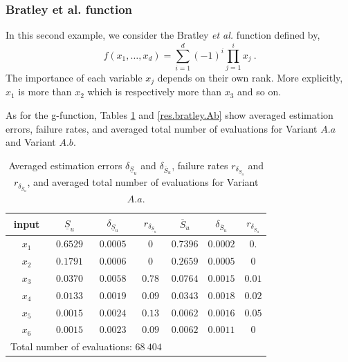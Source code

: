 \subsubsection{Bratley et al. function}

In this second example, we consider the Bratley \textit{et al.} function defined by,
$$f(x_1,\dots,x_d)=\sum \limits_{i=1}^{d} (-1)^i \prod \limits_{j=1}^{i} x_j \ .$$
The importance of each variable $x_j$ depends on their own rank. More explicitly, $x_1$ is more  than $x_2$ which is respectively more  than $x_3$ and so on. 

As for the g-function, Tables \ref{res.bratley.Aa} and \ref{res.bratley.Ab} show averaged estimation errors, failure rates, and averaged total number of evaluations for Variant $A.a$ and Variant $A.b$.
\begin{table}[t]
\caption{Averaged estimation errors $\delta_{\underline{S}_u}$ and $\delta_{\overline{S}_u}$, failure rates $r_{\delta_{\underline{S}_u}}$ and $r_{\delta_{\overline{S}_u}}$, and averaged total number of evaluations for Variant $A.a$.}
\centering
\begin{tabular}{ccccccc}
\hline
 input & $\underline{S}_u$ & $\delta_{\underline{S}_u}$ & $r_{\delta_{\underline{S}_u}}$ & $\overline{S}_u$ & $\delta_{\overline{S}_u}$ &$r_{\delta_{\overline{S}_u}}$ \\ \hline
 $x_1$ & $0.6529$ &  $0.0005$ & $0$ & $0.7396$ & $0.0002$ & $0.$ \\ \hline
 $x_2$ & $0.1791$ &  $0.0006$ & $0$ & $0.2659$ & $0.0005$ & $0$ \\ \hline
 $x_3$ & $0.0370$ &  $0.0058$ & $0.78$ & $0.0764$ & $0.0015$ & $0.01$ \\ \hline
 $x_4$ & $0.0133$ &  $0.0019$ & $0.09$ & $0.0343$ & $0.0018$ & $0.02$ \\ \hline
 $x_5$ & $0.0015$ &  $0.0024$ & $0.13$ & $0.0062$ & $0.0016$ & $0.05$ \\ \hline
 $x_6$ & $0.0015$ & $0.0023$ & $0.09$  & $0.0062$ & $0.0011$ & $0$ \\ \hline \hline
\multicolumn{4}{l}{Total number of evaluations: $68 \ 404$} & & &\\ \hline 
\end{tabular}
\label{res.bratley.Aa}
\end{table}
